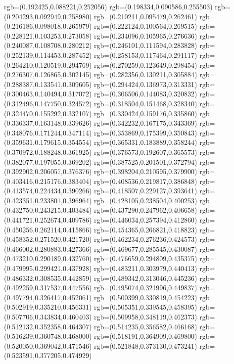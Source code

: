 {{{			rgb=(0.192425,0.088221,0.252056)
			rgb=(0.198334,0.090586,0.255503)
			rgb=(0.204293,0.092949,0.258980)
			rgb=(0.210211,0.095479,0.262461)
			rgb=(0.216186,0.098018,0.265979)
			rgb=(0.222124,0.100564,0.269515)
			rgb=(0.228121,0.103253,0.273058)
			rgb=(0.234096,0.105965,0.276636)
			rgb=(0.240087,0.108708,0.280212)
			rgb=(0.246101,0.111594,0.283828)
			rgb=(0.252139,0.114453,0.287452)
			rgb=(0.258153,0.117464,0.291117)
			rgb=(0.264210,0.120519,0.294769)
			rgb=(0.270259,0.123649,0.298454)
			rgb=(0.276307,0.126865,0.302145)
			rgb=(0.282356,0.130211,0.305884)
			rgb=(0.288387,0.133541,0.309605)
			rgb=(0.294424,0.136973,0.313331)
			rgb=(0.300463,0.140494,0.317072)
			rgb=(0.306506,0.144083,0.320832)
			rgb=(0.312496,0.147750,0.324572)
			rgb=(0.318504,0.151468,0.328340)
			rgb=(0.324470,0.155292,0.332107)
			rgb=(0.330424,0.159176,0.335860)
			rgb=(0.336337,0.163148,0.339626)
			rgb=(0.342232,0.167175,0.343369)
			rgb=(0.348076,0.171244,0.347114)
			rgb=(0.353869,0.175399,0.350843)
			rgb=(0.359631,0.179615,0.354554)
			rgb=(0.365331,0.183889,0.358244)
			rgb=(0.370972,0.188248,0.361925)
			rgb=(0.376573,0.192607,0.365573)
			rgb=(0.382077,0.197055,0.369202)
			rgb=(0.387525,0.201501,0.372794)
			rgb=(0.392902,0.206057,0.376376)
			rgb=(0.398204,0.210595,0.379900)
			rgb=(0.403416,0.215176,0.383404)
			rgb=(0.408536,0.219817,0.386848)
			rgb=(0.413574,0.224434,0.390266)
			rgb=(0.418507,0.229127,0.393641)
			rgb=(0.423351,0.233801,0.396964)
			rgb=(0.428105,0.238504,0.400253)
			rgb=(0.432750,0.243215,0.403484)
			rgb=(0.437290,0.247962,0.406658)
			rgb=(0.441721,0.252674,0.409786)
			rgb=(0.446034,0.257394,0.412860)
			rgb=(0.450256,0.262114,0.415866)
			rgb=(0.454365,0.266821,0.418823)
			rgb=(0.458352,0.271520,0.421720)
			rgb=(0.462234,0.276236,0.424573)
			rgb=(0.466002,0.280883,0.427366)
			rgb=(0.469677,0.285545,0.430087)
			rgb=(0.473210,0.290189,0.432760)
			rgb=(0.476659,0.294809,0.435375)
			rgb=(0.479995,0.299421,0.437928)
			rgb=(0.483211,0.303979,0.440413)
			rgb=(0.486332,0.308535,0.442859)
			rgb=(0.489342,0.313046,0.445236)
			rgb=(0.492259,0.317537,0.447556)
			rgb=(0.495074,0.321996,0.449837)
			rgb=(0.497794,0.326417,0.452061)
			rgb=(0.500399,0.330819,0.454223)
			rgb=(0.502919,0.335210,0.456331)
			rgb=(0.505351,0.339545,0.458395)
			rgb=(0.507706,0.343834,0.460403)
			rgb=(0.509958,0.348119,0.462373)
			rgb=(0.512132,0.352358,0.464307)
			rgb=(0.514235,0.356582,0.466168)
			rgb=(0.516239,0.360748,0.468000)
			rgb=(0.518191,0.364909,0.469800)
			rgb=(0.520050,0.369042,0.471546)
			rgb=(0.521848,0.373130,0.473241)
			rgb=(0.523591,0.377205,0.474929)
}}}
